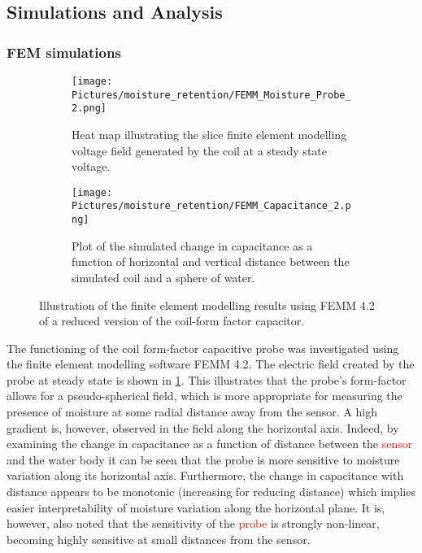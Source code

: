 \subsection{Simulations and Analysis}

\subsubsection{FEM simulations} %

\begin{figure*}
    \centering
    \begin{subfigure}[b]{0.7\textwidth}
        \centering
        \texttt{[image: Pictures/moisture\_retention/FEMM\_Moisture\_Probe\_2.png]}
        \captionsetup{justification = centering}
        \caption{Heat map illustrating the slice finite element modelling voltage field generated by the coil at a steady state voltage.}
        \label{fig:FEMM_Voltage}
    \end{subfigure}%
    \vspace{5mm}
    \begin{subfigure}[b]{0.7\textwidth}
        \centering
        \texttt{[image: Pictures/moisture\_retention/FEMM\_Capacitance\_2.png]}
        \captionsetup{justification = centering}
        \caption{Plot of the simulated change in capacitance as a function of horizontal and vertical distance between the simulated coil and a sphere of water.}
        \label{fig:FEMM_Capacitance}
    \end{subfigure}
    \captionsetup{justification = centering}
    \caption{Illustration of the finite element modelling results using FEMM 4.2 of a reduced version of the coil-form factor capacitor.}
\end{figure*}


The functioning of the coil form-factor capacitive probe was investigated using the finite element modelling software FEMM 4.2. The electric field created by the probe at steady state is shown in \cref{fig:FEMM_Voltage}. This illustrates that the probe's form-factor allows for a pseudo-spherical field, which is more appropriate for measuring the presence of moisture at some radial distance away from the sensor. A high gradient is, however, observed in the field along the horizontal axis. Indeed, by examining the change in capacitance as a function of distance between the \textcolor{red}{sensor} and the water body it can be seen that the probe is more sensitive to moisture variation along its horizontal axis. Furthermore, the change in capacitance with distance appears to be monotonic (increasing for reducing distance) which implies easier interpretability of moisture variation along the horizontal plane. It is, however, also noted that the sensitivity of the \textcolor{red}{probe} is strongly non-linear, becoming highly sensitive at small distances from the sensor.

